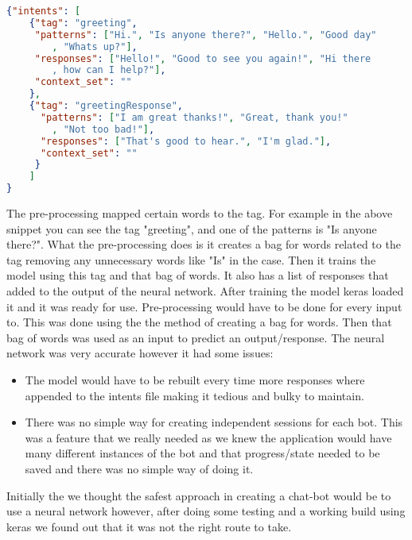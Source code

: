 \begin{lstlisting}[language=JSON]
{"intents": [
    {"tag": "greeting",
     "patterns": ["Hi.", "Is anyone there?", "Hello.", "Good day"
        , "Whats up?"],
     "responses": ["Hello!", "Good to see you again!", "Hi there
        , how can I help?"],
     "context_set": ""
    },
    {"tag": "greetingResponse",
      "patterns": ["I am great thanks!", "Great, thank you!"
        , "Not too bad!"],
      "responses": ["That's good to hear.", "I'm glad."],
      "context_set": ""
     }
    ]
}
\end{lstlisting}

The pre-processing mapped certain words to the tag. For example in the above snippet you can see the tag "greeting", and one of the patterns is "Is anyone there?". What the pre-processing does is it creates a bag for words related to the tag removing any unnecessary words like "Is" in the case. Then it trains the model using this tag and that bag of words. It also has a list of responses that added to the output of the neural network. After training the model keras loaded it and it was ready for use. Pre-processing would have to be done for every input to. This was done using the the method of creating a bag for words. Then that bag of words was used as an input to predict an output/response. The neural network was very accurate however it had some issues:

\begin{itemize}
  \item The model would have to be rebuilt every time more responses where appended to the intents file making it tedious and bulky to maintain.
  \item There was no simple way for creating independent sessions for each bot. This was a feature that we really needed as we knew the application would have many different instances of the bot and that progress/state needed to be saved and there was no simple way of doing it.
\end{itemize}

Initially the we thought the safest approach in creating a chat-bot would be to use a neural network however, after doing some testing and a working build using keras we found out that it was not the right route to take.

